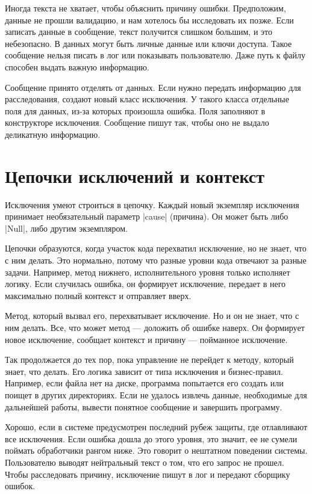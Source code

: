 Иногда текста не хватает, чтобы объяснить причину ошибки. Предположим, данные не
прошли валидацию, и нам хотелось бы исследовать их позже. Если записать данные в
сообщение, текст получится слишком большим, и это небезопасно. В данных могут
быть личные данные или ключи доступа. Такое сообщение нельзя писать в лог или
показывать пользователю. Даже путь к файлу способен выдать важную информацию.

Сообщение принято отделять от данных. Если нужно передать информацию для
расследования, создают новый класс исключения. У такого класса отдельные поля
для данных, из-за которых произошла ошибка. Поля заполняют в конструкторе
исключения. Сообщение пишут так, чтобы оно не выдало деликатную информацию.


\section{Цепочки исключений и контекст}

Исключения умеют строиться в цепочку. Каждый новый экземпляр исключения
принимает необязательный параметр \spverb|cause| (причина). Он может быть либо \spverb|Null|,
либо другим экземпляром.

Цепочки образуются, когда участок кода перехватил исключение, но не знает, что с
ним делать. Это нормально, потому что разные уровни кода отвечают за разные
задачи. Например, метод нижнего, исполнительного уровня только исполняет логику.
Если случилась ошибка, он формирует исключение, передает в него максимально
полный контекст и отправляет вверх.

Метод, который вызвал его, перехватывает исключение. Но и он не знает, что с ним
делать. Все, что может метод — доложить об ошибке наверх. Он формирует новое
исключение, сообщает контекст и причину — пойманное исключение.

Так продолжается до тех пор, пока управление не перейдет к методу, который
знает, что делать. Его логика зависит от типа исключения и
бизнес-правил. Например, если файла нет на диске, программа попытается его
создать или поищет в других директориях. Если не удалось извлечь данные,
необходимые для дальнейшей работы, вывести понятное сообщение и завершить
программу.

Хорошо, если в системе предусмотрен последний рубеж защиты, где отлавливают все
исключения. Если ошибка дошла до этого уровня, это значит, ее не сумели поймать
обработчики рангом ниже. Это говорит о нештатном поведении системы. Пользователю
выводят нейтральный текст о том, что его запрос не прошел. Чтобы расследовать
причину, исключение пишут в лог и передают сборщику ошибок.


